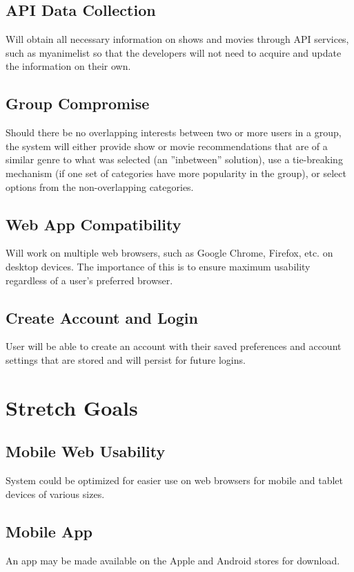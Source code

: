 \documentclass{article}
\begin{document}
\subsection{API Data Collection}
Will obtain all necessary information on shows and movies through API services, such as myanimelist so that the developers will not need to acquire and update 
the information on their own.

\subsection{Group Compromise}
Should there be no overlapping interests between two or more users in a group, the system will either provide show or movie recommendations that are of a similar 
genre to what was selected (an ”inbetween” solution), use a tie-breaking mechanism (if one set of categories have more popularity in the group), or select options 
from the non-overlapping categories.

\subsection{Web App Compatibility}
Will work on multiple web browsers, such as Google Chrome, Firefox, etc. on desktop devices. The importance of this is to ensure maximum usability regardless of 
a user's preferred browser.

\subsection{Create Account and Login}
User will be able to create an account with their saved preferences and account settings that are stored and will persist for future logins.

\section{Stretch Goals}

\subsection{Mobile Web Usability}
System could be optimized for easier use on web browsers for mobile and tablet devices of various sizes.

\subsection{Mobile App}
An app may be made available on the Apple and Android stores for download.
\end{document}
